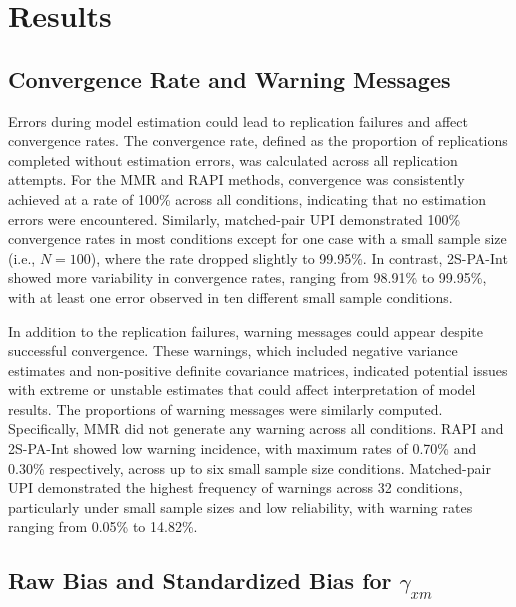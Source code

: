 \documentclass[
  man]{apa6}
\begin{document}
\section{Results}\label{results}

\subsection{Convergence Rate and Warning Messages}\label{convergence-rate-and-warning-messages}

Errors during model estimation could lead to replication failures and affect convergence rates. The convergence rate, defined as the proportion of replications completed without estimation errors, was calculated across all replication attempts. For the MMR and RAPI methods, convergence was consistently achieved at a rate of 100\% across all conditions, indicating that no estimation errors were encountered. Similarly, matched-pair UPI demonstrated 100\% convergence rates in most conditions except for one case with a small sample size (i.e., \(\textit{N} = 100\)), where the rate dropped slightly to 99.95\%. In contrast, 2S-PA-Int showed more variability in convergence rates, ranging from 98.91\% to 99.95\%, with at least one error observed in ten different small sample conditions.

In addition to the replication failures, warning messages could appear despite successful convergence. These warnings, which included negative variance estimates and non-positive definite covariance matrices, indicated potential issues with extreme or unstable estimates that could affect interpretation of model results. The proportions of warning messages were similarly computed. Specifically, MMR did not generate any warning across all conditions. RAPI and 2S-PA-Int showed low warning incidence, with maximum rates of 0.70\% and 0.30\% respectively, across up to six small sample size conditions. Matched-pair UPI demonstrated the highest frequency of warnings across 32 conditions, particularly under small sample sizes and low reliability, with warning rates ranging from 0.05\% to 14.82\%.

\subsection{\texorpdfstring{Raw Bias and Standardized Bias for \(\gamma_{xm}\)}{Raw Bias and Standardized Bias for \textbackslash gamma\_\{xm\}}}\label{raw-bias-and-standardized-bias-for-gamma_xm}
\end{document}
